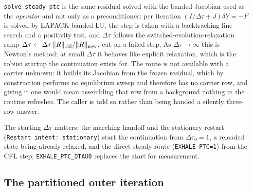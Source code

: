 \texttt{solve\_steady\_ptc} is the same residual solved with the banded
Jacobian used as the \emph{operator} and not only as a preconditioner: per
iteration $(I/\Delta\tau + J)\delta Y = -F$ is solved by LAPACK banded LU,
the step is taken with a backtracking line search and a positivity test, and
$\Delta\tau$ follows the switched-evolution-relaxation ramp
$\Delta\tau \leftarrow \Delta\tau\,\|R\|_{\rm old}/\|R\|_{\rm new}$, cut on a
failed step.  As $\Delta\tau \to \infty$ this is Newton's method; at small
$\Delta\tau$ it behaves like explicit relaxation, which is the robust startup
the continuation exists for.  The route is not available with a carrier
unknown: it builds its Jacobian from the frozen residual, which by
construction performs no equilibrium sweep and therefore has no carrier row,
and giving it one would mean assembling that row from a background nothing in
the routine refreshes.  The caller is told so rather than being handed a
silently three-row answer.

The starting $\Delta\tau$ matters: the marching handoff and the stationary
restart (\texttt{Restart intent: stationary}) start the continuation from
$\Delta\tau_0 = 1$, a reloaded state being already relaxed, and the direct
steady route (\texttt{EXHALE\_PTC=1}) from the CFL step;
\texttt{EXHALE\_PTC\_DTAU0} replaces the start for measurement.

\subsection{The partitioned outer iteration}
\label{sec:steady:partitioned}


